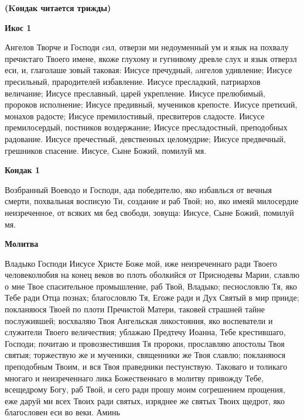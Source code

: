 \medskip
\bfseries (Kондак читается трижды)\normalfont{}


\medskip
\bfseries Икос 1\normalfont{}


Ангелов
Творче и Господи cил, отверзи ми недоуменный ум и язык на похвалу пречистаго Твоего имене, якоже глухому и гугнивому древле слух и язык отверзл еси, и, глаголаше зовый таковая: Иисусе пречудный, aнгелов удивление; Иисусе пресильный, прародителей избавление. Иисусе пресладкий, патриархов величание; Иисусе преславный, царей укрепление. Иисусе прелюбимый, пророков исполнение; Иисусе предивный, мучеников крепосте. Иисусе претихий, монахов радосте; Иисусе премилостивый, пресвитеров сладосте. Иисусе премилосердый, постников воздержание; Иисусе пресладостный, преподобных радование. Иисусе пречестный, девственных целомудрие; Иисусе предвечный, грешников спасение. Иисусе, Сыне Божий, помилуй мя.


\medskip
\bfseries Кондак 1\normalfont{}


Возбранный
Воеводо и Господи, ада победителю, яко избавлься от вечныя смерти, похвальная восписую Ти, создание и раб Твой; но, яко имеяй милосердие неизреченное, от всяких мя бед свободи, зовуща: Иисусе, Сыне Божий, помилуй мя.


\medskip
\bfseries Молитва\normalfont{}


Владыко
Господи Иисусе Христе Боже мой, иже неизреченнаго ради Твоего человеколюбия на конец веков во плоть оболкийся от Приснодевы Марии, славлю о мне Твое спасительное промышление, раб Твой, Владыко;
песнословлю Тя, яко Тебе ради Отца познах; благословлю Тя, Егоже ради и Дух Святый в мир прииде; покланяюся Твоей по плоти Пречистой Матери, таковей страшней тайне послужившей; восхваляю Твоя Ангельская ликостояния, яко воспеватели и служители Твоего величествия; ублажаю Предтечу Иоанна, Тебе крестившаго, Господи; почитаю и провозвестившия Тя пророки, прославляю апостолы Твоя святыя; торжествую же и мученики, священники же Твоя славлю; покланяюся преподобным Твоим, и вся Твоя праведники пестунствую. Таковаго и толикаго многаго и неизреченнаго лика Божественнаго в молитву привожду Тебе, всещедрому Богу, раб Твой, и сего ради прошу моим согрешением прощения, еже даруй ми всех Твоих ради святых, изряднее же святых Твоих щедрот, яко благословен еси во веки. Аминь

\mychapterending

 

